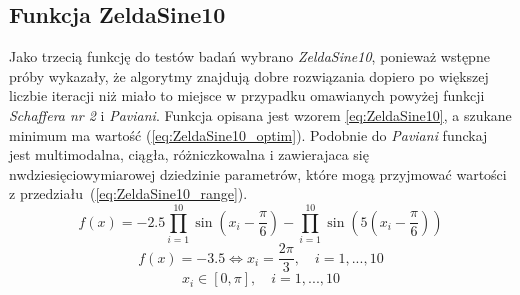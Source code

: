 \subsection{Funkcja ZeldaSine10}
Jako trzecią funkcję do testów badań wybrano \emph{ZeldaSine10}, ponieważ wstępne próby wykazały, że algorytmy znajdują dobre rozwiązania dopiero po większej liczbie iteracji niż miało to miejsce w przypadku omawianych powyżej funkcji \emph{Schaffera nr 2} i \emph{Paviani}. Funkcja opisana jest wzorem \ref{eq:ZeldaSine10}, a szukane minimum ma wartość (\ref{eq:ZeldaSine10_optim}). Podobnie do \emph{Paviani} funckaj jest multimodalna, ciągła, różniczkowalna i zawierajaca się nwdziesięciowymiarowej dziedzinie parametrów, które mogą przyjmować wartości z przedziału~(\ref{eq:ZeldaSine10_range}). 
\begin{equation}\label{eq:ZeldaSine10}
f(x)=-2.5\prod_{i=1}^{10} \sin\left(x_i-\frac{\pi}{6}\right) - \prod_{i=1}^{10} \sin\left(5\left(x_i-\frac{\pi}{6}\right)\right)
\end{equation}
\begin{equation} \label{eq:ZeldaSine10_optim}
f(x)=-3.5 \Leftrightarrow x_i = \frac{2\pi}{3},\quad i = 1, ..., 10
\end{equation}
\begin{equation} \label{eq:ZeldaSine10_range}
x_i\in[0,\pi], \quad i=1,...,10
\end{equation}


